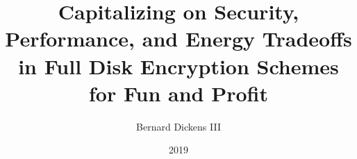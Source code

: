 \documentclass{ucetd}
\title{Capitalizing on Security, Performance, and Energy Tradeoffs in Full Disk Encryption Schemes for Fun and Profit}
\author{Bernard Dickens III}
\date{2019}
\begin{document}
\maketitle


\tableofcontents
\listoffigures
\listoftables


\abstract


\mainmatter







\printbibliography

%
%
\end{document}
